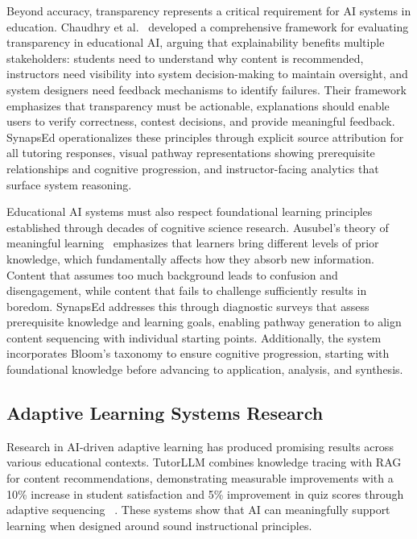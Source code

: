 \documentclass{stylefiles/capstone}
\begin{document}
Beyond accuracy, transparency represents a critical requirement for AI systems in education. Chaudhry et al.~\cite{chaudhry2022transparencyindexframeworkai} developed a comprehensive framework for evaluating transparency in educational AI, arguing that explainability benefits multiple stakeholders: students need to understand why content is recommended, instructors need visibility into system decision-making to maintain oversight, and system designers need feedback mechanisms to identify failures. Their framework emphasizes that transparency must be actionable, explanations should enable users to verify correctness, contest decisions, and provide meaningful feedback. SynapsEd operationalizes these principles through explicit source attribution for all tutoring responses, visual pathway representations showing prerequisite relationships and cognitive progression, and instructor-facing analytics that surface system reasoning.

Educational AI systems must also respect foundational learning principles established through decades of cognitive science research. Ausubel's theory of meaningful learning~\cite{ausubel1978educational} emphasizes that learners bring different levels of prior knowledge, which fundamentally affects how they absorb new information. Content that assumes too much background leads to confusion and disengagement, while content that fails to challenge sufficiently results in boredom. SynapsEd addresses this through diagnostic surveys that assess prerequisite knowledge and learning goals, enabling pathway generation to align content sequencing with individual starting points. Additionally, the system incorporates Bloom's taxonomy to ensure cognitive progression, starting with foundational knowledge before advancing to application, analysis, and synthesis.

\subsection{Adaptive Learning Systems Research}

Research in AI-driven adaptive learning has produced promising results across various educational contexts. TutorLLM combines knowledge tracing with RAG for content recommendations, demonstrating measurable improvements with a 10\% increase in student satisfaction and 5\% improvement in quiz scores through adaptive sequencing ~\cite{Li}. These systems show that AI can meaningfully support learning when designed around sound instructional principles.
\end{document}
